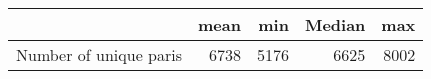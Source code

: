 \begin{tabular}{lrrrr}
\toprule
{} &  mean &   min &  Median &   max \\
\midrule
Number of unique paris &  6738 &  5176 &    6625 &  8002 \\
\bottomrule
\end{tabular}
